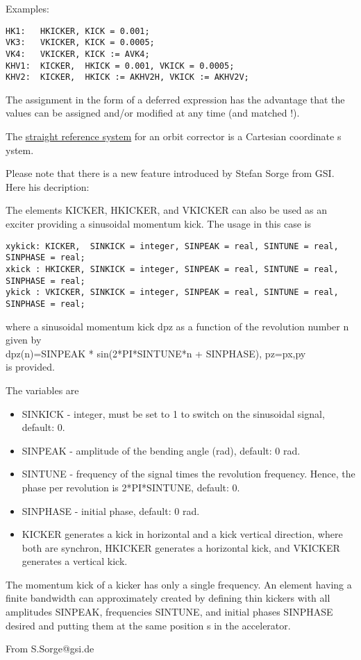  Examples: 
\begin{verbatim}
HK1:   HKICKER, KICK = 0.001;
VK3:   VKICKER, KICK = 0.0005;
VK4:   VKICKER, KICK := AVK4;
KHV1:  KICKER,  HKICK = 0.001, VKICK = 0.0005;
KHV2:  KICKER,  HKICK := AKHV2H, VKICK := AKHV2V;
\end{verbatim} 

The assignment in the form of a deferred expression has the advantage
that the values can be assigned and/or modified at any time (and matched
!).  

The \href{local_system.html#straight}{straight reference system} for an
orbit corrector is a Cartesian coordinate s ystem.  

Please note that there is a new feature introduced by Stefan Sorge from GSI. Here his decription:

The elements KICKER, HKICKER, and VKICKER can also be used as  an
exciter providing a sinusoidal momentum kick. The usage in this case is   

\begin{verbatim}
xykick: KICKER,  SINKICK = integer, SINPEAK = real, SINTUNE = real, SINPHASE = real;  
xkick : HKICKER, SINKICK = integer, SINPEAK = real, SINTUNE = real, SINPHASE = real;  
ykick : VKICKER, SINKICK = integer, SINPEAK = real, SINTUNE = real, SINPHASE = real;  
\end{verbatim}
where a sinusoidal momentum kick dpz as a function of the  revolution
number n given by\\   
dpz(n)=SINPEAK * sin(2*PI*SINTUNE*n + SINPHASE), pz=px,py \\ 
is provided. 

The variables are 

\begin{itemize}
   \item SINKICK - integer, must be set to 1 to switch on the sinusoidal
     signal, default: 0.  
   \item SINPEAK - amplitude of the bending angle (rad), default: 0 rad.  
   \item SINTUNE - frequency of the signal times the revolution
     frequency.  Hence, the phase per revolution is 2*PI*SINTUNE,
     default: 0.   
   \item SINPHASE - initial phase, default: 0 rad.  
   \item KICKER generates a kick in horizontal and a kick vertical
     direction,  where both are synchron, HKICKER generates a horizontal
     kick,  and VKICKER generates a vertical kick.   
\end{itemize}

The momentum kick of a kicker has only a single frequency. An element
having a finite bandwidth can approximately created by defining  thin
kickers with all amplitudes SINPEAK, frequencies SINTUNE, and  initial
phases SINPHASE desired and putting them at the same position s in  the
accelerator.   

From S.Sorge@gsi.de  

